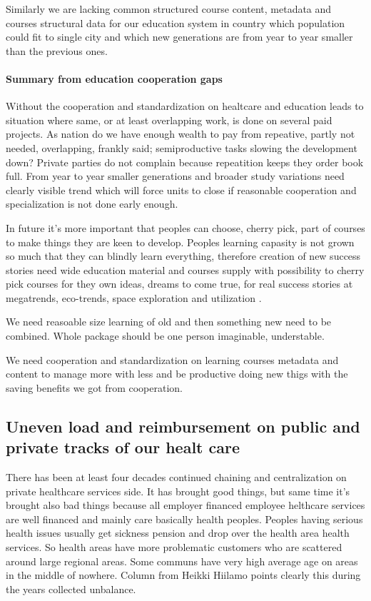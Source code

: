 Similarly we are lacking common structured course content, metadata and
courses structural data for our education system\allowbreak\cite{
 CoursesAndRequirements} in country which population could fit to single city
and which new generations are from year to year smaller than the previous
ones\allowbreak\cite{KTLRT16}.

\paragraph{Summary from education cooperation gaps}
\label{education_cooperation_gaps}

Without the cooperation and standardization on healtcare and education leads
to situation where same, or at least overlapping work, is done on several paid
projects. As nation do we have enough wealth to pay from repeative, partly not
needed, overlapping, frankly said; semi\-productive tasks slowing the
development down? Private parties do not complain because repeatition keeps
they order book full. From year to year smaller generations and broader study
variations need clearly visible trend which will force units to close if
reasonable cooperation and specialization is not done early enough.

In future it's more important that peoples can choose, cherry pick, part of
courses to make things they are keen to develop. Peoples learning capasity
is not grown so much that they can blindly learn everything, therefore
creation of new success stories need wide education material and courses
supply with possibility to cherry pick courses for they own ideas, dreams
to come true, for real success stories at megatrends, eco-trends, space
exploration and utilization \cite{VN/34515/2024}.

We need reasoable size learning of old and then something new need to
be combined. Whole package should be one person imaginable, understable.

We need cooperation and standardization on learning courses metadata and
content to manage more with less and be productive doing new thigs with
the saving benefits we got from cooperation.

\subsection{Uneven load and reimbursement on public and private tracks of
our healt care}
\label{unbalance_on_two_tracks}
There has been at least four decades continued chaining and centralization on
private healthcare services side. It has brought good things, but same time
it's brought also bad things because all employer financed employee helthcare
services are well financed and mainly care basically health peoples. Peoples
having serious health issues usually get sickness pension and drop over the
health area health services. So health areas have more problematic customers
who are scattered around large regional areas. Some communs have very high
average age on areas in the middle of nowhere. Column from Heikki Hiilamo
\cite{HiilamonKolumni202411250645} points clearly this during the years
collected unbalance.

